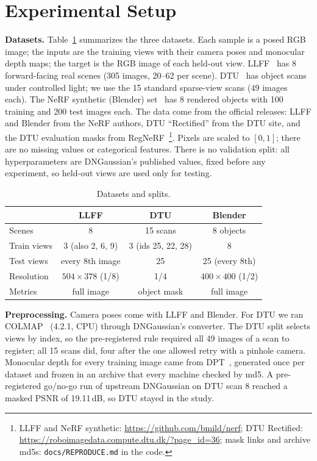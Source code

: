 \documentclass[conference]{IEEEtran}
\newcommand{\dB}{\,dB}
\begin{document}
\section{Experimental Setup}\label{sec:setup}
\textbf{Datasets.} Table~\ref{tab:data} summarizes the three datasets. Each sample is a posed RGB image; the inputs are the training views with their camera poses and monocular depth maps; the target is the RGB image of each held-out view. LLFF~\cite{mildenhall2019llff} has 8 forward-facing real scenes (305 images, 20--62 per scene). DTU~\cite{jensen2014dtu} has object scans under controlled light; we use the 15 standard sparse-view scans (49 images each). The NeRF synthetic (Blender) set~\cite{mildenhall2020nerf} has 8 rendered objects with 100 training and 200 test images each. The data come from the official releases: LLFF and Blender from the NeRF authors, DTU ``Rectified'' from the DTU site, and the DTU evaluation masks from RegNeRF~\cite{niemeyer2022regnerf}\footnote{LLFF and NeRF synthetic: \url{https://github.com/bmild/nerf}; DTU Rectified: \url{https://roboimagedata.compute.dtu.dk/?page_id=36}; mask links and archive md5s: \texttt{docs/REPRODUCE.md} in the code.}. Pixels are scaled to $[0,1]$; there are no missing values or categorical features. There is no validation split: all hyperparameters are DNGaussian's published values, fixed before any experiment, so held-out views are used only for testing.

\begin{table}[t]
\caption{Datasets and splits.}\label{tab:data}
\centering\footnotesize\setlength{\tabcolsep}{2.5pt}
\begin{tabular}{@{}lccc@{}}
\toprule
 & LLFF & DTU & Blender \\
\midrule
Scenes & 8 & 15 scans & 8 objects \\
Train views & 3 (also 2, 6, 9) & 3 (ids 25, 22, 28) & 8 \\
Test views & every 8th image & 25 & 25 (every 8th) \\
Resolution & $504\times378$ (1/8) & 1/4 & $400\times400$ (1/2) \\
Metrics & full image & object mask & full image \\
\bottomrule
\end{tabular}
\end{table}

\textbf{Preprocessing.} Camera poses come with LLFF and Blender. For DTU we ran COLMAP~\cite{schoenberger2016sfm} (4.2.1, CPU) through DNGaussian's converter. The DTU split selects views by index, so the pre-registered rule required all 49 images of a scan to register; all 15 scans did, four after the one allowed retry with a pinhole camera. Monocular depth for every training image came from DPT~\cite{ranftl2021dpt}, generated once per dataset and frozen in an archive that every machine checked by md5. A pre-registered go/no-go run of upstream DNGaussian on DTU scan 8 reached a masked PSNR of 19.11\dB, so DTU stayed in the study.
\end{document}
